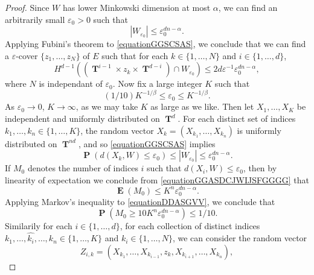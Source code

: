 \documentclass[12pt,reqno]{article}
\numberwithin{equation}{section}
\DeclareMathOperator{\TT}{\mathbf{T}}
\DeclareMathOperator{\EE}{\mathbf{E}}
\DeclareMathOperator{\PP}{\mathbf{P}}
\begin{document}
\begin{proof}
    Since $W$ has lower Minkowski dimension at most $\alpha$, we can find an arbitrarily small $\varepsilon_0 > 0$ such that
    \begin{equation} \label{equationGGSCSAS}
        |W_{\varepsilon_0}| \leq \varepsilon_0^{dn - \alpha}.
    \end{equation}
    Applying Fubini's theorem to \eqref{equationGGSCSAS}, we conclude that we can find a $\varepsilon$-cover $\{ z_1, \dots, z_N \}$ of $E$ such that for each $k \in \{ 1, \dots, N \}$ and $i \in \{ 1, \dots, d \}$,
    \begin{equation} \label{equationFISIJCISJIX123}
        H^{d-1} \left( (\TT^{i-1} \times z_k \times \TT^{d-i}) \cap W_{\varepsilon_0} \right) \leq 2d \varepsilon^{-1} \varepsilon_0^{dn-\alpha},
    \end{equation}
    where $N$ is independant of $\varepsilon_0$. Now fix a large integer $K$ such that
    \[ (1/10)K^{-1/\beta} \leq \varepsilon_0 \leq K^{-1/\beta}. \]
    As $\varepsilon_0 \to 0$, $K \to \infty$, as we may take $K$ as large as we like. Then let $X_1, \dots, X_K$ be independent and uniformly distributed on $\TT^d$. For each distinct set of indices $k_1, \dots, k_n \in \{ 1, \dots, K \}$, the random vector $X_k = (X_{k_1}, \dots, X_{k_n})$ is uniformly distributed on $\TT^{nd}$, and so \eqref{equationGGSCSAS} implies
    \begin{equation} \label{equationGGASDCJWIJSFGGGG}
        \PP(d(X_k,W) \leq \varepsilon_0) \leq |W_{\varepsilon_0}| \leq \varepsilon_0^{dn - \alpha}.
    \end{equation}
    If $M_0$ denotes the number of indices $i$ such that $d(X_i,W) \leq \varepsilon_0$, then by linearity of expectation we conclude from \eqref{equationGGASDCJWIJSFGGGG} that
    \begin{equation} \label{equationDDASGVV}
        \EE(M_0) \leq K^n \varepsilon_0^{dn - \alpha}.
    \end{equation}
    Applying Markov's inequality to \eqref{equationDDASGVV}, we conclude that
    \begin{equation} \label{equationFGGGSC}
        \PP(M_0 \geq 10 K^n \varepsilon_0^{dn - \alpha}) \leq 1/10.
    \end{equation}
    Similarily for each $i \in \{ 1, \dots, d \}$, for each collection of distinct indices $k_1, \dots, \widehat{k_i}, \dots, k_n \in \{ 1, \dots, K \}$ and $k_i \in \{ 1, \dots, N \}$, we can consider the random vector
    \[ Z_{i,k} = (X_{k_1}, \dots, X_{k_{i-1}}, z_k, X_{k_{i+1}}, \dots, X_{k_n}), \]

\end{proof}
\end{document}
